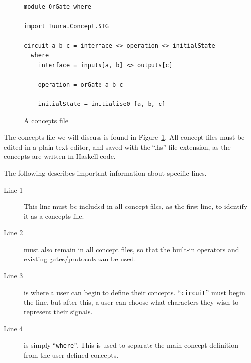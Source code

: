 \documentclass[british,conference,compsoc]{IEEEtran}
\begin{document}
\begin{figure}[H]
\begin{centering}

\begin{lstlisting}
module OrGate where

import Tuura.Concept.STG

circuit a b c = interface <> operation <> initialState
  where
    interface = inputs[a, b] <> outputs[c]

    operation = orGate a b c

    initialState = initialise0 [a, b, c]
\end{lstlisting}

\par\end{centering}
\vspace{-2mm}
\begin{centering}
\protect\caption{\label{fig:concepts_file}A concepts file}
\vspace{-2mm}
\par\end{centering}

\end{figure}

The concepts file we will discuss is found in Figure~\ref{fig:concepts_file}.
All concept files must be edited in a plain-text editor, and saved with the 
``.hs'' file extension, as the concepts are written in Haskell code. 

The following describes important information about specific lines.

\begin{description}
  \item [Line 1]
  This line must be included in all concept files, as the first line, to 
  identify it as a concepts file.
  
  \item [Line 2] must also remain in all concept files, so that the built-in
  operators and existing gates/protocols can be used. 
  
  \item [Line 3] is where a user can begin to define their concepts. 
  ``\texttt{circuit}'' must begin the line, but after this, a user can choose 
  what characters they wish to represent their signals.
  
  \item [Line 4] is simply ``\texttt{where}''. This is used to separate the main
  concept definition from the user-defined concepts.

\end{description}
\end{document}
